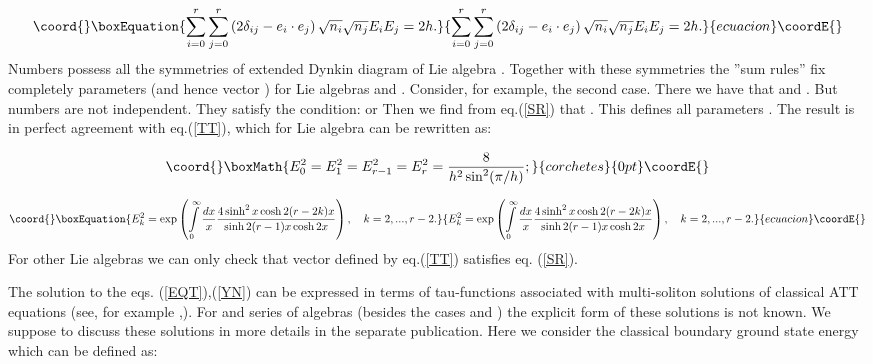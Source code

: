 \documentclass[a4paper,12pt]{article}
\begin{document}
\begin{equation}\coord{}\boxEquation{
\sum\limits_{i=0}^r\sum\limits_{j=0}^r\left( 2\delta _{ij}-e_i\cdot e_j\right) 
\sqrt{n_i}\sqrt{n_j}E_iE_j=2h.  \label{SR}
}{
\sum\limits_{i=0}^r\sum\limits_{j=0}^r\left( 2\delta _{ij}-e_i\cdot e_j\right) 
\sqrt{n_i}\sqrt{n_j}E_iE_j=2h.  }{ecuacion}\coordE{}\end{equation}
Numbers \coordHE{} possess all the symmetries of extended Dynkin diagram of Lie
algebra \coordHE{}. Together with these symmetries the ''sum rules'' fix
completely parameters \coordHE{} (and hence vector \myHighlight{$\vartheta $}\coordHE{}) for Lie algebras 
\coordHE{} and \coordHE{}. Consider, for example, the second case. There we have that 
\coordHE{} and \coordHE{}. But numbers \coordHE{} are not independent.
They satisfy the condition: \coordHE{} or \coordHE{} Then
we find from eq.(\ref{SR}) that \coordHE{}. This defines all
parameters \coordHE{}. The result is in perfect agreement with eq.(\ref{TT}),
which for Lie algebra \coordHE{} can be rewritten as:

\[\coord{}\boxMath{
E_0^2=E_1^2=E_{r-1}^2=E_r^2=\frac 8{h^2\sin ^2(\pi /h)}; 
}{corchetes}{0pt}\coordE{}\]

\begin{equation}\coord{}\boxEquation{
E_k^2=\exp \left( \int\limits_0^\infty \frac{dx}x\frac{4\sinh ^2x\cosh 2(r-2k)x}{\sinh
2(r-1)x\cosh 2x}\right) ,\quad k=2,...,r-2.  \label{ESQW}
}{
E_k^2=\exp \left( \int\limits_0^\infty \frac{dx}x\frac{4\sinh ^2x\cosh 2(r-2k)x}{\sinh
2(r-1)x\cosh 2x}\right) ,\quad k=2,...,r-2.  }{ecuacion}\coordE{}\end{equation}
For other Lie algebras we can only check that vector \myHighlight{$\vartheta $}\coordHE{} defined by
eq.(\ref{TT}) satisfies eq. (\ref{SR}).

The solution to the eqs. (\ref{EQT}),(\ref{YN}) can be expressed in terms
of tau-functions associated with multi-soliton solutions of classical ATT
equations (see, for example \cite{BOWC},\cite{BOW}). For \coordHE{} and \coordHE{} series
of algebras (besides the cases \coordHE{} and \coordHE{} \cite{BOWC} ) the explicit
form of these solutions is not known. We suppose to discuss these solutions
in more details in the separate publication. Here we consider the classical
boundary ground state energy which can be defined as:
\end{document}
